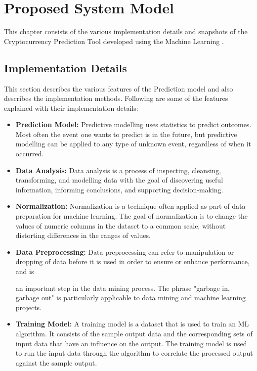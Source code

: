 \documentclass[openany,12pt]{report}
\begin{document}
\chapter{Proposed System Model}
This chapter consists of the various implementation details and snapshots of the Cryptocurrency Prediction Tool developed using the Machine Learning .

\section{Implementation Details}
This section describes the various features of the Prediction model and also describes the implementation methods. Following are some of the features explained with their implementation details:\\
\begin{itemize}

\item{\textbf{Prediction Model:}}
Predictive modelling uses statistics to predict outcomes. Most often the event one wants to predict is in the future, but predictive modelling can be applied to any type of unknown event, regardless of when it occurred.

\item{\textbf{Data Analysis:}}
Data analysis is a process of inspecting, cleansing, transforming, and modelling data with the goal of discovering useful information, informing conclusions, and supporting decision-making. 

\item{\textbf{Normalization:}} Normalization is a technique often applied as part of data preparation for machine learning. The goal of normalization is to change the values of numeric columns in the dataset to a common scale, without distorting differences in the ranges of
values.

\item{\textbf{Data Preprocessing:}}
Data preprocessing can refer to manipulation or dropping of data before it is used in order to ensure or enhance performance, and is

an important step in the data mining process. The phrase "garbage in, garbage out" is particularly applicable to data mining and machine learning projects.

\item{\textbf{Training Model:}}
A training model is a dataset that is used to train an ML algorithm. It consists of the sample output data and the corresponding sets of input data that have an influence on the output. The training model is used to run the input data through the algorithm to correlate the processed output against the sample output.


\end{itemize}
\end{document}
